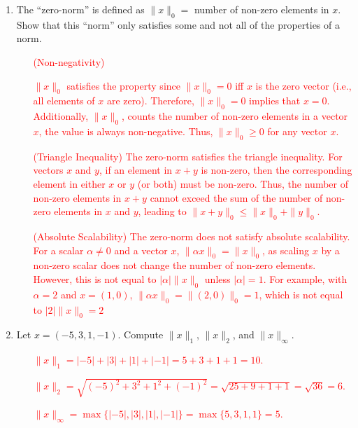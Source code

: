 \documentclass[11pt]{article}
\begin{document}
\begin{enumerate}
\begin{enumerate}
  
  \item The ``zero-norm'' is defined as $\| x \|_0 = $ number of non-zero elements in
    $x$.  Show that this ``norm'' only satisfies some and not all of the properties of a norm.\\[-.25cm]
    
\begin{enumerate}
    \item[\textcolor{red}{(Non-negativity)}] 

        \textcolor{red}{$\|x\|_0$ satisfies the property since $\|x\|_0 = 0$ iff $x$ is the zero vector (i.e., all elements of $x$ are zero). Therefore, $\|x\|_0 = 0$ implies that $x = 0$. Additionally, $\|x\|_0$, counts the number of non-zero elements in a vector $x$, the value is always non-negative. Thus, $\|x\|_0 \geq 0$ for any vector $x$.}

    \item[\textcolor{red}{(Triangle Inequality)}]
        \textcolor{red}{The zero-norm satisfies the triangle inequality. For vectors $x$ and $y$, if an element in $x + y$ is non-zero, then the corresponding element in either $x$ or $y$ (or both) must be non-zero. Thus, the number of non-zero elements in $x + y$ cannot exceed the sum of the number of non-zero elements in $x$ and $y$, leading to $\|x + y\|_0 \leq \|x\|_0 + \|y\|_0$.}

    \item[\textcolor{red}{(Absolute Scalability)}]
        \textcolor{red}{The zero-norm does not satisfy absolute scalability. For a scalar $\alpha \neq 0$ and a vector $x$, $\|\alpha x\|_0 = \|x\|_0$, as scaling $x$ by a non-zero scalar does not change the number of non-zero elements. However, this is not equal to $|\alpha|\|x\|_0$ unless $|\alpha| = 1$. For example, with $\alpha = 2$ and $x = (1, 0)$, $\|\alpha x\|_0 = \|(2, 0)\|_0 = 1$, which is not equal to $|2|\|x\|_0 = 2$}
\end{enumerate}



    
  \item Let $x = (-5, 3, 1, -1).$  Compute $\| x \|_1$, $\| x \|_2$, and $\| x \|_{\infty}$.\\[-.25cm]

    \begin{enumerate}
        \item[\textcolor{red}{}]
            \textcolor{red}{$\|x\|_1 = |-5| + |3| + |1| + |-1| = 5 + 3 + 1 + 1 = 10$.} \\
        \item[\textcolor{red}{}] 
            \textcolor{red}{$\|x\|_2 = \sqrt{(-5)^2 + 3^2 + 1^2 + (-1)^2} = \sqrt{25 + 9 + 1 + 1} = \sqrt{36} = 6$.} \\
        \item[\textcolor{red}{}]
            \textcolor{red}{$\|x\|_\infty = \max\{|-5|, |3|, |1|, |-1|\} = \max\{5, 3, 1, 1\} = 5$.}
    \end{enumerate}



\end{enumerate}
\end{enumerate}
\end{document}

